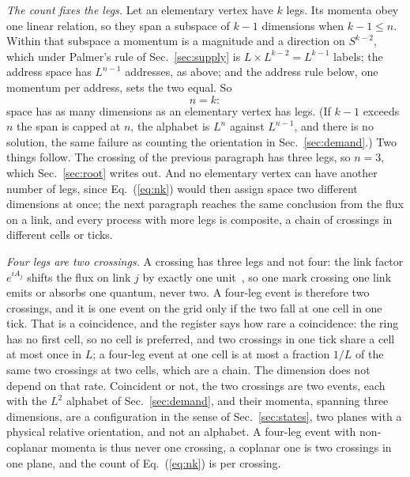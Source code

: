 \documentclass[aps,prd,twocolumn,superscriptaddress,nofootinbib]{revtex4-2}
\begin{document}
\textit{The count fixes the legs.} Let an elementary vertex have $k$ legs. Its momenta obey one linear relation, so they span a subspace of $k-1$ dimensions when $k-1 \le n$. Within that subspace a momentum is a magnitude and a direction on $S^{k-2}$, which under Palmer's rule of Sec.~\ref{sec:supply} is $L\times L^{k-2} = L^{k-1}$ labels; the address space has $L^{n-1}$ addresses, as above; and the address rule below, one momentum per address, sets the two equal. So
\begin{equation}
n = k :
\label{eq:nk}
\end{equation}
space has as many dimensions as an elementary vertex has legs. (If $k-1$ exceeds $n$ the span is capped at $n$, the alphabet is $L^n$ against $L^{n-1}$, and there is no solution, the same failure as counting the orientation in Sec.~\ref{sec:demand}.) Two things follow. The crossing of the previous paragraph has three legs, so $n = 3$, which Sec.~\ref{sec:root} writes out. And no elementary vertex can have another number of legs, since Eq.~(\ref{eq:nk}) would then assign space two different dimensions at once; the next paragraph reaches the same conclusion from the flux on a link, and every process with more legs is composite, a chain of crossings in different cells or ticks.

\textit{Four legs are two crossings.} A crossing has three legs and not four: the link factor $e^{iA_j}$ shifts the flux on link $j$ by exactly one unit~\cite{kogut1975}, so one mark crossing one link emits or absorbs one quantum, never two. A four-leg event is therefore two crossings, and it is one event on the grid only if the two fall at one cell in one tick. That is a coincidence, and the register says how rare a coincidence: the ring has no first cell, so no cell is preferred, and two crossings in one tick share a cell at most once in $L$; a four-leg event at one cell is at most a fraction $1/L$ of the same two crossings at two cells, which are a chain. The dimension does not depend on that rate. Coincident or not, the two crossings are two events, each with the $L^2$ alphabet of Sec.~\ref{sec:demand}, and their momenta, spanning three dimensions, are a configuration in the sense of Sec.~\ref{sec:states}, two planes with a physical relative orientation, and not an alphabet. A four-leg event with non-coplanar momenta is thus never one crossing, a coplanar one is two crossings in one plane, and the count of Eq.~(\ref{eq:nk}) is per crossing.
\end{document}
